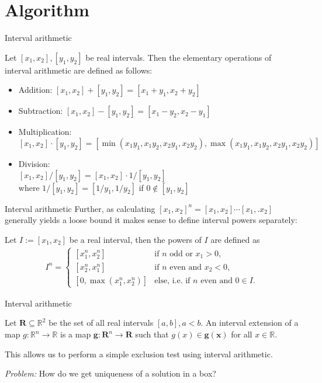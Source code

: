 \documentclass[german,10pt,xcolor=colortbl,compress]{beamer}
\begin{document}
\section{Algorithm}
\begin{frame}{Interval arithmetic}
    \begin{definition}
    Let $[x_1,x_2], [y_1,y_2]$ be real intervals. Then the elementary operations of interval arithmetic are defined as follows:
        \begin{itemize}
            \item Addition: $[x_1,x_2] + [y_1,y_2] = [x_1+y_1,x_2+y_2]$
            \item Subtraction: $[x_1,x_2] - [y_1,y_2] = [x_1-y_2,x_2-y_1]$
            \item Multiplication: $[x_1,x_2] \cdot [y_1,y_2] = [\min(x_1y_1,x_1y_2,x_2y_1,x_2y_2), \max(x_1y_1,x_1y_2,x_2y_1,x_2y_2)]$
            \item Division: \\ $[x_1,x_2] / [y_1,y_2] = [x_1,x_2] \cdot 1/[y_1,y_2]$ \\where $1/[y_1,y_2]= [1/y_1, 1/y_2]$ if $0 \notin [y_1,y_2] $
        \end{itemize}
    \end{definition}
\end{frame}

\begin{frame}{Interval arithmetic}
    Further, as calculating $[x_1,x_2]^n = [x_1, x_2] \cdots [x_1,. x_2]$ generally yields a
    loose bound it makes sense to define interval powers separately:
    \begin{definition}
        Let $I := [x_1, x_2]$ be a real interval, then the powers of $I$ are defined
        as
        \begin{align*}
            I^n =
            \begin{cases}
                [x_1^n, x_2^n] & \text{if $n$ odd or $x_1 > 0$,} \\
                [x_2^n, x_1^n] & \text{if $n$ even and $x_2 < 0$,} \\
                [0, \max(x_1^n, x_2^n)] & \text{else, i.e. if $n$ even and $0\in I$.}
            \end{cases}
        \end{align*}
    \end{definition}
\end{frame}

\begin{frame}{Interval arithmetic}
    \begin{definition}
        Let  $\mathbf{R} \subseteq \mathbb{R}^2$ be the set of all real intervals $[a,b],
        a < b$. An interval extension of a map $g: \mathbb{R}^n \to \mathbb{R}$ is a map
        $\mathbf{g}: \mathbf{R}^n \to \mathbf{R}$ such that $g(x) \in
        \mathbf{g}(\mathbf{x}) $ for all $x \in \mathbb{R}$.
    \end{definition}

    This allows us to perform a simple exclusion test using interval arithmetic.
    \bigskip

    \emph{Problem:} How do we get uniqueness of a solution in a box?
\end{frame}
\end{document}
